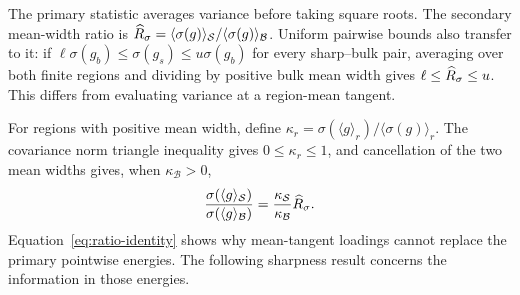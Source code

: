 The primary statistic averages variance before taking square roots. The secondary
mean-width ratio is $\widehat{R}_{\sigma}=\langle\sigma(g)\rangle_{\mathcal S}/
\langle\sigma(g)\rangle_{\mathcal B}$. Uniform pairwise bounds also transfer to it:
if $\ell\sigma(g_b)\le\sigma(g_s)\le u\sigma(g_b)$ for every sharp--bulk pair, averaging
over both finite regions and dividing by positive bulk mean width gives
$\ell\le\widehat{R}_{\sigma}\le u$. This differs from evaluating variance at a region-mean tangent.

For regions with positive mean width, define
$\kappa_r=\sigma(\langle g\rangle_r)/\langle\sigma(g)\rangle_r$.
The covariance norm triangle inequality gives $0\le\kappa_r\le1$, and cancellation
of the two mean widths gives, when $\kappa_{\mathcal B}>0$,
\begin{equation}\label{eq:ratio-identity}
 \frac{\sigma(\langle g\rangle_{\mathcal S})}{\sigma(\langle g\rangle_{\mathcal B})}
 =\frac{\kappa_{\mathcal S}}{\kappa_{\mathcal B}}\widehat{R}_{\sigma}.
\end{equation}
Equation~\eqref{eq:ratio-identity} shows why mean-tangent loadings cannot replace
the primary pointwise energies. The following sharpness result concerns the
information in those energies.




